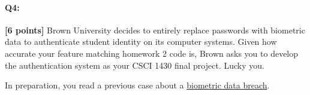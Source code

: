 \documentclass[11pt]{article}
\begin{document}
\begin{enumerate}[(a)]
\end{enumerate}

\pagebreak



\paragraph{Q4:} \textbf{[6 points]} Brown University decides to entirely replace passwords with biometric data to authenticate student identity on its computer systems. Given how accurate your feature matching homework 2 code is, Brown asks you to develop the authentication system as your CSCI 1430 final project. Lucky you.

In preparation, you read a previous case about a \href{https://www.vpnmentor.com/blog/report-biostar2-leak/}{biometric data breach}.
\end{document}
